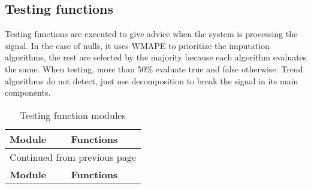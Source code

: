\documentclass[a4paper]{article}
\begin{document}
\subsection{Testing functions}
\label{sec:orgf1d8f35}

Testing functions are executed to give advice when the system is processing the signal. In the case of nulls, it uses WMAPE to prioritize the imputation algorithms, the rest are selected by the majority because each algorithm evaluates the same. When testing, more than 50\% evaluate true and false otherwise. Trend algorithms do not detect, just use decomposition to break the signal in its main components.

\sffamily
\begin{longtable}{ll}
\caption{Testing function modules}
\\[0pt]
\textbf{Module} & \textbf{Functions}\\[0pt]
\hline
\endfirsthead
\multicolumn{2}{l}{Continued from previous page} \\[0pt]
\hline

\textbf{Module} & \textbf{Functions} \\[0pt]


\end{longtable}
\end{document}
